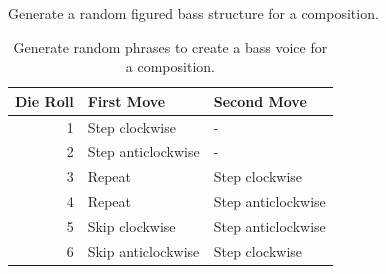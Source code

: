 \documentclass{scrartcl}
\numberwithin{example}{section}
\begin{document}
\begin{table}[ht]
\caption{Generate a random figured bass structure for a composition.}
\centering
\begin{subtable}[t]{0.9\textwidth}
\centering
\caption{Generate random phrases to create a bass voice for a composition.\newline }
\begin{tabular}{@{}r l l@{}}
\toprule
Die Roll & First Move & Second Move \\
\midrule
1 & Step clockwise & - \\
2 & Step anticlockwise & - \\
3 & Repeat & Step clockwise \\
4 & Repeat & Step anticlockwise \\
5 & Skip clockwise & Step anticlockwise \\
6 & Skip anticlockwise & Step clockwise \\
\bottomrule
\end{tabular}
\end{subtable}

\bigskip\bigskip


\end{table}
\end{document}
